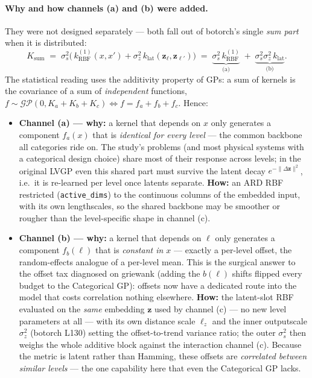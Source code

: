 \documentclass[11pt]{article}
\begin{document}
\paragraph{Why and how channels (a) and (b) were added.} They were not designed
separately --- both fall out of botorch's single \emph{sum part} when it is distributed:
$$
K_{\mathrm{sum}} \;=\; \sigma_s^2\big(\,k^{(1)}_{\mathrm{RBF}}(x,x') +
\sigma_z^2\,k_{\mathrm{lat}}(\mathbf z_\ell, \mathbf z_{\ell'})\big)
\;=\; \underbrace{\sigma_s^2\, k^{(1)}_{\mathrm{RBF}}}_{\text{(a)}} \;+\;
\underbrace{\sigma_s^2\sigma_z^2\, k_{\mathrm{lat}}}_{\text{(b)}} .
$$
The statistical reading uses the additivity property of GPs: a sum of kernels is the covariance
of a sum of \emph{independent} functions, $f \sim \mathcal{GP}(0, K_a + K_b + K_c)
\iff f = f_a + f_b + f_c$. Hence:
\begin{itemize}
\item \textbf{Channel (a) --- why:} a kernel that depends on $x$ only generates a component
$f_a(x)$ that is \emph{identical for every level} --- the common backbone all categories ride
on. The study's problems (and most physical systems with a categorical design choice) share
most of their response across levels; in the original LVGP even this shared part must survive
the latent decay $e^{-\|\Delta\mathbf z\|^2}$, i.e.\ it is re-learned per level once latents
separate. \textbf{How:} an ARD RBF restricted (\texttt{active\_dims}) to the continuous
columns of the embedded input, with its own lengthscales, so the shared backbone may be
smoother or rougher than the level-specific shape in channel (c).
\item \textbf{Channel (b) --- why:} a kernel that depends on $\ell$ only generates a component
$f_b(\ell)$ that is \emph{constant in $x$} --- exactly a per-level offset, the random-effects
analogue of a per-level mean. This is the surgical answer to the offset tax diagnosed on
griewank (adding the $b(\ell)$ shifts flipped every budget to the Categorical GP): offsets now
have a dedicated route into the model that costs correlation nothing elsewhere. \textbf{How:}
the latent-slot RBF evaluated on the \emph{same} embedding $\mathbf z$ used by channel (c) ---
no new level parameters at all --- with its own distance scale $\ell_z$ and the inner
outputscale $\sigma_z^2$ (botorch L130) setting the offset-to-trend variance ratio; the outer
$\sigma_s^2$ then weighs the whole additive block against the interaction channel (c). Because
the metric is latent rather than Hamming, these offsets are \emph{correlated between similar
levels} --- the one capability here that even the Categorical GP lacks.
\end{itemize}
\end{document}
